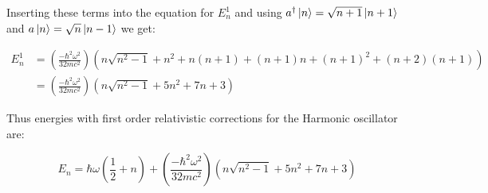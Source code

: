 Inserting these terms into the equation for $E^1_n$ and using $a^\dagger \ket{n} = \sqrt{n+1} \ket{n+1}$ and $a \ket{n} = \sqrt{n} \ket{n-1}$ we get:

\begin{equation}
\begin{split}
    E^1_n &=  \left( \frac{-\hbar^2 \omega^2}{32 m c^2} \right) \left( n\sqrt{n^2 - 1} + n^2 + n(n+1) + (n+1)n + (n+1)^2 + (n+2)(n+1) \right) \\
    &=  \left( \frac{-\hbar^2 \omega^2}{32 m c^2} \right) \left( n\sqrt{n^2 - 1} + 5n^2 + 7n + 3 \right) 
\end{split}
\end{equation}

Thus energies with first order relativistic corrections for the Harmonic oscillator are:

\begin{equation}
    E_n = \hbar \omega \left( \frac{1}{2} + n\right) + \left( \frac{-\hbar^2 \omega^2}{32 m c^2} \right) \left( n\sqrt{n^2 - 1} + 5n^2 + 7n + 3 \right) 
\end{equation}
